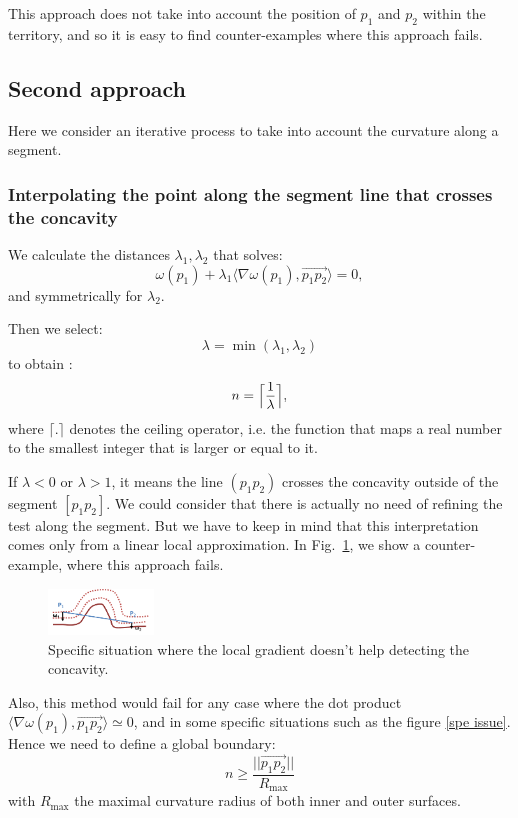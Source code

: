 \documentclass[11pt,a4paper]{article}
\newcommand{\scal}[2]{\ensuremath{\langle #1 , #2 \rangle}}
\begin{document}
This approach does not take into account the position of $p_1$ and $p_2$ within the territory, and so it is easy to find counter-examples where this approach fails.

\subsection{Second approach}

Here we consider an iterative process to take into account the curvature along a segment.

\subsubsection{Interpolating the point along the segment line that crosses the concavity} \label{subsec}
We calculate the distances $\lambda_1,\lambda_2$ that solves:
\begin{equation}
\omega (p_1) + \lambda_1 \scal{\nabla\omega(p_1)}{\overset{\rightarrow}{p_1p_2}} =  0,
\end{equation}
and symmetrically for $\lambda_2$.


Then we select:
\begin{equation}
\lambda = \min(\lambda_1, \lambda_2)
\end{equation}
to obtain :
\begin{equation}
n = \Bigl\lceil \frac{1}{\lambda} \Bigr\rceil,
\end{equation}
where $\lceil.\rceil$ denotes the ceiling operator, i.e. the function that maps a real number to the smallest integer that is larger or equal to it.

If  $\lambda < 0$ or $\lambda > 1$, it means the line $(p_1p_2)$ crosses the concavity outside of the segment $[p_1p_2]$. We could consider that there is actually no need of refining the test along the segment. But we have to keep in mind that this interpretation comes only from a linear local approximation. In Fig.~\ref{fig:cec}, we show a counter-example, where this approach fails.

\begin{figure}[h!]
			\label{spe issue}
			\centering
			\includegraphics[width=0.25\textwidth]{Drawings/CurvatureTestExample1.png}
			\caption{Specific situation where the local gradient doesn't help detecting the concavity.\label{fig:cec}}
\end{figure}
Also, this method would fail for any case where the dot product $\scal{\nabla \omega(p_1)}{\overset{\rightarrow}{p_1p_2}} \simeq 0$, and in some specific situations such as the figure \ref{spe issue}. Hence we need to define a global boundary:
\begin{equation}
n \geq \frac{||\overset{\rightarrow}{p_1p_2}||}{R_{\text{max}}}
\end{equation}
with $R_{\text{max}}$ the maximal curvature radius of both inner and outer surfaces.
\end{document}
